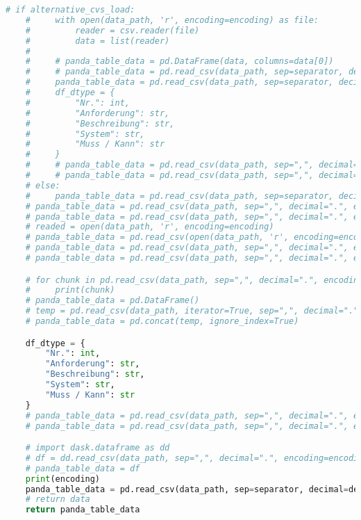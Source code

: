 \begin{lstlisting}[language=python, caption=Python LaTex - pandas\_dataframe\_to\_latex\_table.py CSV - LaTex Tabelle,captionpos=b,label={lst:Python LaTex - pandas_dataframe_to_latex_table},breaklines=true]
    # if alternative_cvs_load:
    #     with open(data_path, 'r', encoding=encoding) as file:
    #         reader = csv.reader(file)
    #         data = list(reader)
    #
    #     # panda_table_data = pd.DataFrame(data, columns=data[0])
    #     # panda_table_data = pd.read_csv(data_path, sep=separator, decimal=decimal, encoding=encoding, lineterminator='\n', engine='python')
    #     panda_table_data = pd.read_csv(data_path, sep=separator, decimal=decimal, encoding=encoding, lineterminator='\n')
    #     df_dtype = {
    #         "Nr.": int,
    #         "Anforderung": str,
    #         "Beschreibung": str,
    #         "System": str,
    #         "Muss / Kann": str
    #     }
    #     # panda_table_data = pd.read_csv(data_path, sep=",", decimal=".", encoding=encoding, lineterminator='\n', dtype=df_dtype)
    #     # panda_table_data = pd.read_csv(data_path, sep=",", decimal=".", encoding=encoding)
    # else:
    #     panda_table_data = pd.read_csv(data_path, sep=separator, decimal=decimal, encoding=encoding)
    # panda_table_data = pd.read_csv(data_path, sep=",", decimal=".", encoding=encoding, low_memory=False, engine='python')
    # panda_table_data = pd.read_csv(data_path, sep=",", decimal=".", encoding=encoding, engine='python', dtype='unicode')
    # readed = open(data_path, 'r', encoding=encoding)
    # panda_table_data = pd.read_csv(open(data_path, 'r', encoding=encoding), sep=",", decimal=".", encoding=encoding)
    # panda_table_data = pd.read_csv(data_path, sep=",", decimal=".", encoding = "ISO-8859-1")
    # panda_table_data = pd.read_csv(data_path, sep=",", decimal=".", encoding=encoding, chunksize=10)

    # for chunk in pd.read_csv(data_path, sep=",", decimal=".", encoding=encoding, chunksize=5):
    #     print(chunk)
    # panda_table_data = pd.DataFrame()
    # temp = pd.read_csv(data_path, iterator=True, sep=",", decimal=".", encoding=encoding, chunksize=1000)
    # panda_table_data = pd.concat(temp, ignore_index=True)

    df_dtype = {
        "Nr.": int,
        "Anforderung": str,
        "Beschreibung": str,
        "System": str,
        "Muss / Kann": str
    }
    # panda_table_data = pd.read_csv(data_path, sep=",", decimal=".", encoding=encoding, engine='python', dtype=df_dtype)
    # panda_table_data = pd.read_csv(data_path, sep=",", decimal=".", encoding=encoding, dtype=df_dtype)

    # import dask.dataframe as dd
    # df = dd.read_csv(data_path, sep=",", decimal=".", encoding=encoding)
    # panda_table_data = df
    print(encoding)
    panda_table_data = pd.read_csv(data_path, sep=separator, decimal=decimal, encoding=encoding)
    # return data
    return panda_table_data



\end{lstlisting}
